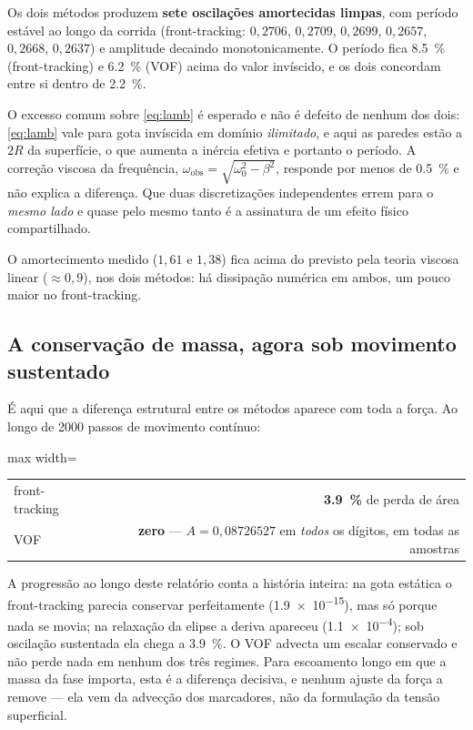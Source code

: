 Os dois m\'etodos produzem \textbf{sete oscila\c{c}\~oes amortecidas limpas},
com per\'iodo est\'avel ao longo da corrida (front-tracking: $0{,}2706$,
$0{,}2709$, $0{,}2699$, $0{,}2657$, $0{,}2668$, $0{,}2637$) e amplitude decaindo
monotonicamente. O per\'iodo fica \SI{8.5}{\percent} (front-tracking) e
\SI{6.2}{\percent} (VOF) acima do valor inv\'iscido, e os dois concordam entre si
dentro de \SI{2.2}{\percent}.

O excesso comum sobre \eqref{eq:lamb} \'e esperado e n\~ao \'e defeito de
nenhum dos dois: \eqref{eq:lamb} vale para gota inv\'iscida em dom\'inio
\emph{ilimitado}, e aqui as paredes est\~ao a $2R$ da superf\'icie, o que aumenta
a in\'ercia efetiva e portanto o per\'iodo. A corre\c{c}\~ao viscosa da
frequ\^encia, $\omega_{\text{obs}} = \sqrt{\omega_0^{2}-\beta^{2}}$, responde por
menos de \SI{0.5}{\percent} e n\~ao explica a diferen\c{c}a. Que duas
discretiza\c{c}\~oes independentes errem para o \emph{mesmo lado} e quase pelo
mesmo tanto \'e a assinatura de um efeito f\'isico compartilhado.

O amortecimento medido ($1{,}61$ e $1{,}38$) fica acima do previsto pela teoria
viscosa linear ($\approx 0{,}9$), nos dois m\'etodos: h\'a dissipa\c{c}\~ao
num\'erica em ambos, um pouco maior no front-tracking.

\subsection{A conserva\c{c}\~ao de massa, agora sob movimento sustentado}

\'E aqui que a diferen\c{c}a estrutural entre os m\'etodos aparece com toda a
for\c{c}a. Ao longo de 2000 passos de movimento cont\'inuo:

\begin{center}
\begin{adjustbox}{max width=\linewidth}
\begin{tabular}{lr}
\toprule
front-tracking & \textbf{\SI{3.9}{\percent}} de perda de \'area \\
VOF            & \textbf{zero} --- $A = 0{,}08726527$ em \emph{todos} os d\'igitos,
                 em todas as amostras \\
\bottomrule
\end{tabular}
\end{adjustbox}
\end{center}

A progress\~ao ao longo deste relat\'orio conta a hist\'oria inteira: na gota
est\'atica o front-tracking parecia conservar perfeitamente (\num{1.9e-15}), mas
s\'o porque nada se movia; na relaxa\c{c}\~ao da elipse a deriva apareceu
(\num{1.1e-4}); sob oscila\c{c}\~ao sustentada ela chega a \SI{3.9}{\percent}.
O VOF advecta um escalar conservado e n\~ao perde nada em nenhum dos tr\^es
regimes. Para escoamento longo em que a massa da fase importa, esta \'e a
diferen\c{c}a decisiva, e nenhum ajuste da for\c{c}a a remove --- ela vem da
advec\c{c}\~ao dos marcadores, n\~ao da formula\c{c}\~ao da tens\~ao superficial.

